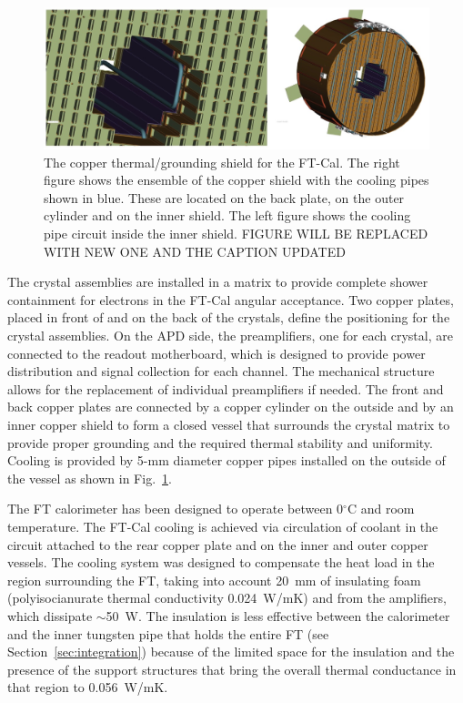 \begin{figure}[th!]
\centering 
\includegraphics[width=1.0\columnwidth]{./fig/raff.jpeg}
\caption{The copper thermal/grounding shield for the FT-Cal. The right figure shows the ensemble of the copper shield with the cooling pipes shown in blue. These are located on the back plate, on the outer cylinder and on the inner shield.  The left figure shows the cooling pipe circuit inside the inner shield. FIGURE WILL BE REPLACED WITH NEW ONE AND THE CAPTION UPDATED}
\label{fig:piping} 
\end{figure}

The crystal assemblies are installed in a matrix to provide complete shower containment for electrons in the FT-Cal
angular acceptance. Two copper plates, placed in front of and on the back of the crystals, define the positioning for
the crystal assemblies. On the APD side, the preamplifiers, one for each crystal, are connected to the readout
motherboard, which is designed to provide power distribution and signal collection for each channel. The mechanical
structure allows for the replacement of individual preamplifiers if needed. The front and back copper plates are
connected by a copper cylinder on the outside and by an inner copper shield to form a closed vessel that surrounds
the crystal matrix to provide proper grounding and the required thermal stability and uniformity. Cooling is provided
by 5-mm diameter copper pipes installed on the outside of the vessel as shown in Fig.~\ref{fig:piping}. 

The FT calorimeter has been designed to operate between 0$^\circ$C and room temperature. The FT-Cal cooling is
achieved via circulation of coolant in the circuit attached to the rear copper plate and on the inner and outer copper
vessels. The cooling system was designed to compensate the heat load in the region surrounding the FT, taking into
account 20~mm of insulating foam (polyisocianurate thermal conductivity 0.024~W/mK) and from the amplifiers, which
dissipate $\sim$50~W. The insulation is less effective between the calorimeter and the inner tungsten pipe that
holds the entire FT (see Section~\ref{sec:integration}) because of the limited space for the insulation and the
presence of the support structures that bring the overall thermal conductance in that region to 0.056~W/mK.

